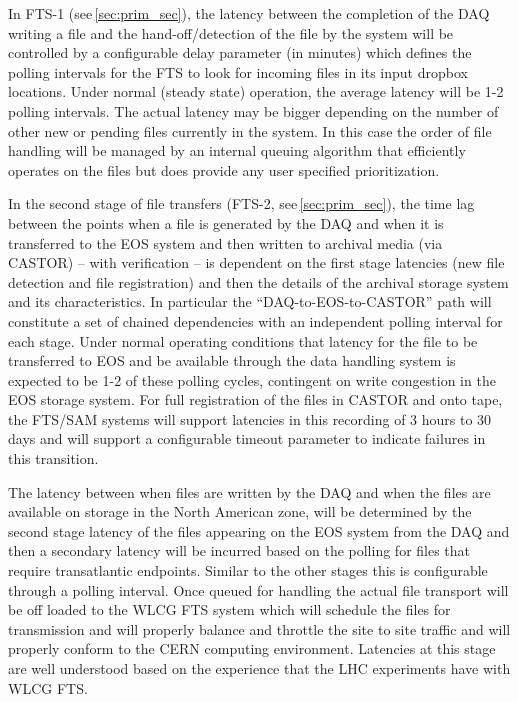 \documentclass[12pt]{article}
\begin{document}
{In FTS-1 (see\,\ref{sec:prim_sec}), the latency between the completion of the DAQ writing a file and the hand-off/detection of the file by the
system will be controlled by a configurable delay parameter (in minutes) which defines the polling intervals for the FTS
to look for  incoming files in its input dropbox locations.  Under normal (steady state) operation, the average latency will be 1-2 polling intervals.
The actual latency may be bigger depending on the number of other new or pending files currently in the system.
In this case the order of file handling will be managed by an internal queuing algorithm that efficiently operates on the files but
does provide any user specified prioritization.

In the second stage of file transfers (FTS-2, see\,\ref{sec:prim_sec}), the time lag between the points when a file is generated by the DAQ
and when it is transferred to the EOS
system and then written to archival media (via CASTOR) -- with verification --  is dependent on the first stage latencies (new file detection and file registration)
and then the details of the archival storage system and its characteristics.  In particular the ``DAQ-to-EOS-to-CASTOR'' path will constitute a set
of chained dependencies with an independent polling interval for each stage.  Under normal operating conditions that latency for the file to
be transferred to EOS and be available through the data handling system is expected to be 1-2 of these polling cycles, contingent on write
congestion in the EOS storage system.   For full registration of the files in CASTOR and onto tape, the FTS/SAM systems will support latencies
in this recording of 3 hours to 30 days and will support a configurable timeout parameter to indicate failures in this transition.

The latency between when files are written by the DAQ and when the files are available on storage in the North American zone,
will be determined by the second stage latency of the files appearing on the EOS system from the DAQ and then a secondary latency
will be incurred based on the polling for files that require transatlantic endpoints.  Similar to the other stages this is configurable
through a polling interval.  Once queued for handling the actual file transport will be off loaded to the WLCG FTS system which will
schedule the files for transmission and will properly balance and throttle the site to site traffic and will properly conform to the CERN
 computing environment.  Latencies at this stage are well understood based on the experience that the LHC experiments have with WLCG FTS.  

}
\end{document}
